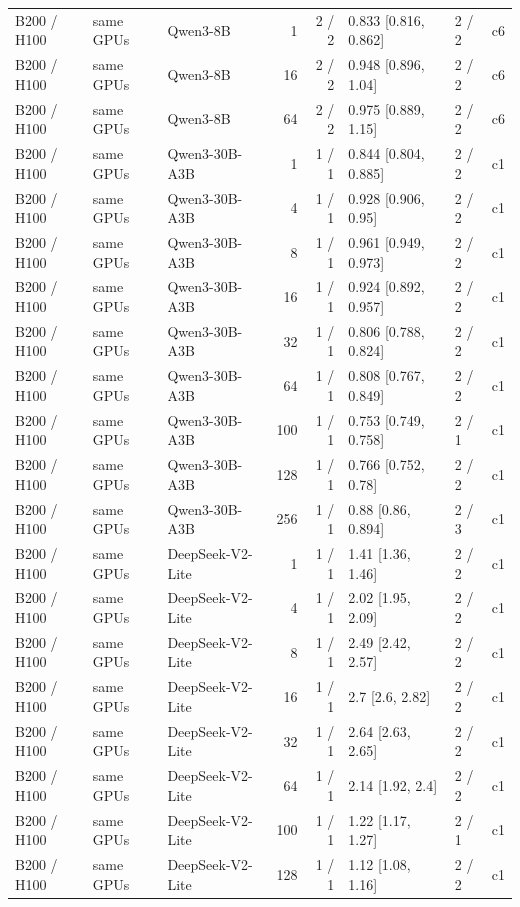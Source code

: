 \begin{longtable}{lllrrlll}
B200 / H100 & same GPUs & Qwen3-8B & 1 & 2 / 2 & 0.833 {[}0.816, 0.862{]} & 2 / 2 & c6 \\
B200 / H100 & same GPUs & Qwen3-8B & 16 & 2 / 2 & 0.948 {[}0.896, 1.04{]} & 2 / 2 & c6 \\
B200 / H100 & same GPUs & Qwen3-8B & 64 & 2 / 2 & 0.975 {[}0.889, 1.15{]} & 2 / 2 & c6 \\
B200 / H100 & same GPUs & Qwen3-30B-A3B & 1 & 1 / 1 & 0.844 {[}0.804, 0.885{]} & 2 / 2 & c1 \\
B200 / H100 & same GPUs & Qwen3-30B-A3B & 4 & 1 / 1 & 0.928 {[}0.906, 0.95{]} & 2 / 2 & c1 \\
B200 / H100 & same GPUs & Qwen3-30B-A3B & 8 & 1 / 1 & 0.961 {[}0.949, 0.973{]} & 2 / 2 & c1 \\
B200 / H100 & same GPUs & Qwen3-30B-A3B & 16 & 1 / 1 & 0.924 {[}0.892, 0.957{]} & 2 / 2 & c1 \\
B200 / H100 & same GPUs & Qwen3-30B-A3B & 32 & 1 / 1 & 0.806 {[}0.788, 0.824{]} & 2 / 2 & c1 \\
B200 / H100 & same GPUs & Qwen3-30B-A3B & 64 & 1 / 1 & 0.808 {[}0.767, 0.849{]} & 2 / 2 & c1 \\
B200 / H100 & same GPUs & Qwen3-30B-A3B & 100 & 1 / 1 & 0.753 {[}0.749, 0.758{]} & 2 / 1 & c1 \\
B200 / H100 & same GPUs & Qwen3-30B-A3B & 128 & 1 / 1 & 0.766 {[}0.752, 0.78{]} & 2 / 2 & c1 \\
B200 / H100 & same GPUs & Qwen3-30B-A3B & 256 & 1 / 1 & 0.88 {[}0.86, 0.894{]} & 2 / 3 & c1 \\
B200 / H100 & same GPUs & DeepSeek-V2-Lite & 1 & 1 / 1 & 1.41 {[}1.36, 1.46{]} & 2 / 2 & c1 \\
B200 / H100 & same GPUs & DeepSeek-V2-Lite & 4 & 1 / 1 & 2.02 {[}1.95, 2.09{]} & 2 / 2 & c1 \\
B200 / H100 & same GPUs & DeepSeek-V2-Lite & 8 & 1 / 1 & 2.49 {[}2.42, 2.57{]} & 2 / 2 & c1 \\
B200 / H100 & same GPUs & DeepSeek-V2-Lite & 16 & 1 / 1 & 2.7 {[}2.6, 2.82{]} & 2 / 2 & c1 \\
B200 / H100 & same GPUs & DeepSeek-V2-Lite & 32 & 1 / 1 & 2.64 {[}2.63, 2.65{]} & 2 / 2 & c1 \\
B200 / H100 & same GPUs & DeepSeek-V2-Lite & 64 & 1 / 1 & 2.14 {[}1.92, 2.4{]} & 2 / 2 & c1 \\
B200 / H100 & same GPUs & DeepSeek-V2-Lite & 100 & 1 / 1 & 1.22 {[}1.17, 1.27{]} & 2 / 1 & c1 \\
B200 / H100 & same GPUs & DeepSeek-V2-Lite & 128 & 1 / 1 & 1.12 {[}1.08, 1.16{]} & 2 / 2 & c1 \\

\end{longtable}
